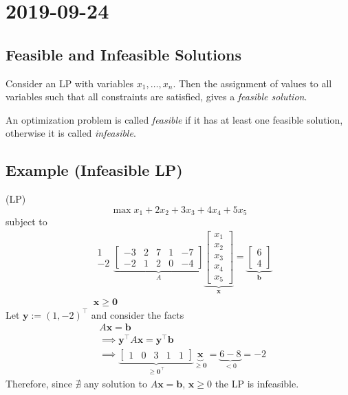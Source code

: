 \section{2019-09-24}
\begin{defbox}
    \subsection{Feasible and Infeasible Solutions}
    Consider an LP with variables $x_1,\dots,x_n$.  Then the
    assignment of values to all variables such that all constraints are satisfied,
    gives a \emph{feasible solution}.

    An optimization problem is called \emph{feasible} if it has at least one feasible
    solution, otherwise it is called \emph{infeasible}.
\end{defbox}

\subsection{Example (Infeasible LP)}
(LP)
\[\max x_1+2x_2+3x_3+4x_4+5x_5\]
subject to
\begin{align*}
    &
    \begin{matrix}
    1\\
    -2
    \end{matrix}
    \underbrace{
        \begin{bmatrix}
        -3 & 2 & 7 & 1 & -7 \\
        -2 & 1 & 2 & 0 & -4
        \end{bmatrix}}_{A}
    \underbrace{\begin{bmatrix}
        x_1\\
        x_2\\
        x_3\\
        x_4\\
        x_5
    \end{bmatrix}}_{\mathbf{x}}
    =
    \underbrace{\begin{bmatrix}
        6\\
        4
    \end{bmatrix}}_{\mathbf{b}}\\
    &\mathbf{x}\ge \mathbf{0}
\end{align*}
Let $\mathbf{y}:=(1,-2)^\top$
and consider the facts
\begin{align*}
    &A\mathbf{x}=\mathbf{b}\\
    &\implies \mathbf{y}^\top A\mathbf{x}=\mathbf{y}^\top \mathbf{b}\\
    &\implies \underbrace{\begin{bmatrix}
        1 & 0 & 3 & 1 & 1
    \end{bmatrix}}_{\ge \mathbf{0}^\top }
    \underbrace{\mathbf{x}}_{\ge \mathbf{0}}=\underbrace{6-8}_{< 0}=-2
\end{align*}
Therefore, since $\nexists$ any solution to $A\mathbf{x}=\mathbf{b}$, $\mathbf{x}\ge 0$
the LP is infeasible.


